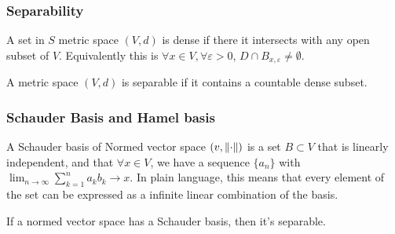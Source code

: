 \documentclass{article}
\begin{document}
\subsubsection{Separability}
\begin{definition}[dense]\rm
	A set in $S$ metric space $(V,d)$ is dense if there it intersects with any open subset of $V$. Equivalently this is $\forall x\in V,\forall \varepsilon>0$, $D\cap B_{x,\varepsilon}\neq \emptyset$.
\end{definition}


\begin{definition}[separable]\rm
	A metric space $(V,d)$ is separable if it contains a countable dense subset.
\end{definition}

\begin{example}\label{separable space example}
\end{example}


\subsubsection{Schauder Basis and Hamel basis}
\begin{definition}\label{Schauder basis}\rm
	A Schauder basis of Normed vector space $(v,\left\|{\cdot}\right\|)$ is a set $B\subset V$ that is linearly independent, and that $\forall x\in V$, we have a sequence $\{a_n\}$ with $\lim_{n\to\infty}\sum_{k=1}^n a_k b_k\to x$. In plain language, this means that every element of the set can be expressed as a infinite linear combination of the basis.
\end{definition}


\begin{proposition}\rm\nextline
	If a normed vector space has a Schauder basis, then it's separable.
\end{proposition}


\end{document}
